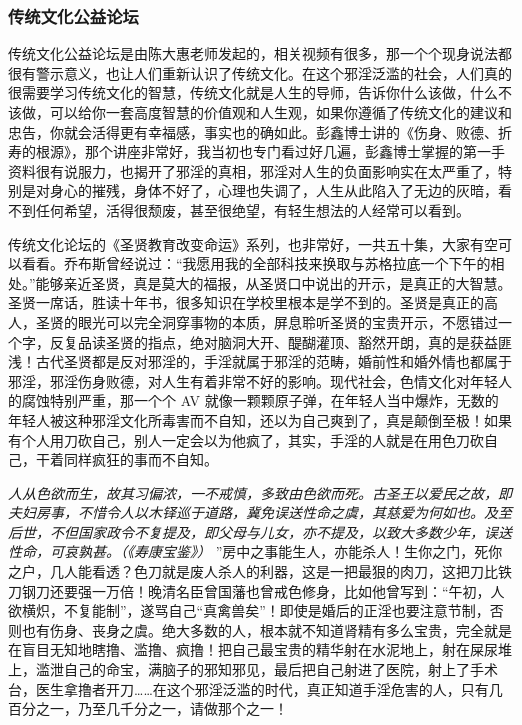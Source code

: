 \subsubsection{传统文化公益论坛}

传统文化公益论坛是由陈大惠老师发起的，相关视频有很多，那一个个现身说法都很有警示意义，也让人们重新认识了传统文化。在这个邪淫泛滥的社会，人们真的很需要学习传统文化的智慧，传统文化就是人生的导师，告诉你什么该做，什么不该做，可以给你一套高度智慧的价值观和人生观，如果你遵循了传统文化的建议和忠告，你就会活得更有幸福感，事实也的确如此。彭鑫博士讲的《伤身、败德、折寿的根源》，那个讲座非常好，我当初也专门看过好几遍，彭鑫博士掌握的第一手资料很有说服力，也揭开了邪淫的真相，邪淫对人生的负面影响实在太严重了，特别是对身心的摧残，身体不好了，心理也失调了，人生从此陷入了无边的灰暗，看不到任何希望，活得很颓废，甚至很绝望，有轻生想法的人经常可以看到。

传统文化论坛的《圣贤教育改变命运》系列，也非常好，一共五十集，大家有空可以看看。乔布斯曾经说过：“我愿用我的全部科技来换取与苏格拉底一个下午的相处。”能够亲近圣贤，真是莫大的福报，从圣贤口中说出的开示，是真正的大智慧。圣贤一席话，胜读十年书，很多知识在学校里根本是学不到的。圣贤是真正的高人，圣贤的眼光可以完全洞穿事物的本质，屏息聆听圣贤的宝贵开示，不愿错过一个字，反复品读圣贤的指点，绝对脑洞大开、醍醐灌顶、豁然开朗，真的是获益匪浅！古代圣贤都是反对邪淫的，手淫就属于邪淫的范畴，婚前性和婚外情也都属于邪淫，邪淫伤身败德，对人生有着非常不好的影响。现代社会，色情文化对年轻人的腐蚀特别严重，那一个个 AV 就像一颗颗原子弹，在年轻人当中爆炸，无数的年轻人被这种邪淫文化所毒害而不自知，还以为自己爽到了，真是颠倒至极！如果有个人用刀砍自己，别人一定会以为他疯了，其实，手淫的人就是在用色刀砍自己，干着同样疯狂的事而不自知。

\textit{人从色欲而生，故其习偏浓，一不戒慎，多致由色欲而死。古圣王以爱民之故，即夫妇房事，不惜令人以木铎巡于道路，冀免误送性命之虞，其慈爱为何如也。及至后世，不但国家政令不复提及，即父母与儿女，亦不提及，以致大多数少年，误送性命，可哀孰甚。（《寿康宝鉴》）} ”房中之事能生人，亦能杀人！生你之门，死你之户，几人能看透？色刀就是废人杀人的利器，这是一把最狠的肉刀，这把刀比铁刀钢刀还要强一万倍！晚清名臣曾国藩也曾戒色修身，比如他曾写到：“午初，人欲横炽，不复能制”，遂骂自己“真禽兽矣”！即使是婚后的正淫也要注意节制，否则也有伤身、丧身之虞。绝大多数的人，根本就不知道肾精有多么宝贵，完全就是在盲目无知地瞎撸、滥撸、疯撸！把自己最宝贵的精华射在水泥地上，射在屎尿堆上，滥泄自己的命宝，满脑子的邪知邪见，最后把自己射进了医院，射上了手术台，医生拿撸者开刀……在这个邪淫泛滥的时代，真正知道手淫危害的人，只有几百分之一，乃至几千分之一，请做那个之一！

